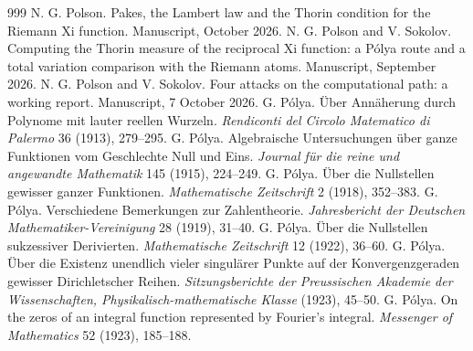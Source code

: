 \begin{thebibliography}{999}
 N. G. Polson. Pakes, the Lambert law and the Thorin condition for the Riemann Xi function. Manuscript, October 2026.
 N. G. Polson and V. Sokolov. Computing the Thorin measure of the reciprocal Xi function: a P\'olya route and a total variation comparison with the Riemann atoms. Manuscript, September 2026.
 N. G. Polson and V. Sokolov. Four attacks on the computational path: a working report. Manuscript, 7 October 2026.
 G. P\'olya. \"Uber Ann\"aherung durch Polynome mit lauter reellen Wurzeln. \emph{Rendiconti del Circolo Matematico di Palermo} 36 (1913), 279--295.
 G. P\'olya. Algebraische Untersuchungen \"uber ganze Funktionen vom Geschlechte Null und Eins. \emph{Journal f\"ur die reine und angewandte Mathematik} 145 (1915), 224--249.
 G. P\'olya. \"Uber die Nullstellen gewisser ganzer Funktionen. \emph{Mathematische Zeitschrift} 2 (1918), 352--383.
 G. P\'olya. Verschiedene Bemerkungen zur Zahlentheorie. \emph{Jahresbericht der Deutschen Mathematiker-Vereinigung} 28 (1919), 31--40.
 G. P\'olya. \"Uber die Nullstellen sukzessiver Derivierten. \emph{Mathematische Zeitschrift} 12 (1922), 36--60.
 G. P\'olya. \"Uber die Existenz unendlich vieler singul\"arer Punkte auf der Konvergenzgeraden gewisser Dirichletscher Reihen. \emph{Sitzungsberichte der Preussischen Akademie der Wissenschaften, Physikalisch-mathematische Klasse} (1923), 45--50.
 G. P\'olya. On the zeros of an integral function represented by Fourier's integral. \emph{Messenger of Mathematics} 52 (1923), 185--188.

\end{thebibliography}
